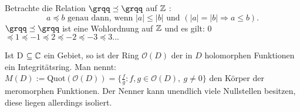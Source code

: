 %

%
%
\begin{bsp}
Betrachte die Relation $\grqq\preceq \grqq $ auf $\mathbb{Z}$ :  
\[a \preceq b \text{ genau dann, wenn } |a| \leq |b| \text{ und } \left( |a| = |b| \Rightarrow a \leq  b \right).\]
 $\grqq\preceq \grqq $ ist eine Wohlordnung auf $\mathbb{Z}$ und es gilt: 0$  \preceq 1 \preceq -1 \preceq 2 \preceq -2 \preceq -3 \preceq 3 ... $ 
\end{bsp}
%
\begin{bsp}
Ist D $\subseteq \mathbb{C}$ ein Gebiet, so ist der Ring $ \mathcal{O} (D) $ der in $D$ holomorphen Funktionen ein Integritätsring. Man nennt: \\
$ M \left(D\right) := $Quot$\left( \mathcal{O} \left( D \right)\right) = \lbrace \frac{f}{g}: f,g \in \mathcal{O} (D), ~g \neq 0\rbrace$ den Körper der meromorphen Funktionen. Der Nenner kann unendlich viele Nullstellen besitzen, diese liegen allerdings isoliert. 
\end{bsp}
%
 
